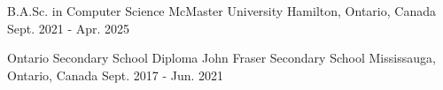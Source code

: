 

\begin{cventries}

  \cventry
    {B.A.Sc. in Computer Science} %
    {McMaster University} %
    {Hamilton, Ontario, Canada} %
    {Sept. 2021 - Apr. 2025} %
    {
    }

  \cventry
    {Ontario Secondary School Diploma} %
    {John Fraser Secondary School} %
    {Mississauga, Ontario, Canada} %
    {Sept. 2017 - Jun. 2021} %
    {
    }

\end{cventries}
